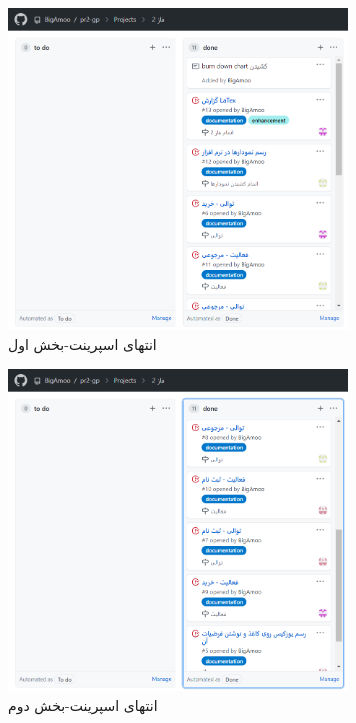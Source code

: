 \documentclass[12pt,a4paper]{article}
\begin{document}
		\begin{figure}[h!]
			\begin{center}
				\includegraphics[width=9cm]{images/screenshot_4.png}
			\end{center}
			\caption{انتهای اسپرینت-بخش اول}
		\end{figure}
			\begin{figure}[h!]
			\begin{center}
				\includegraphics[width=9cm]{images/screenshot_5.png}	
			\end{center}
			\caption{انتهای اسپرینت-بخش دوم}
		\end{figure}
		
\end{document}
